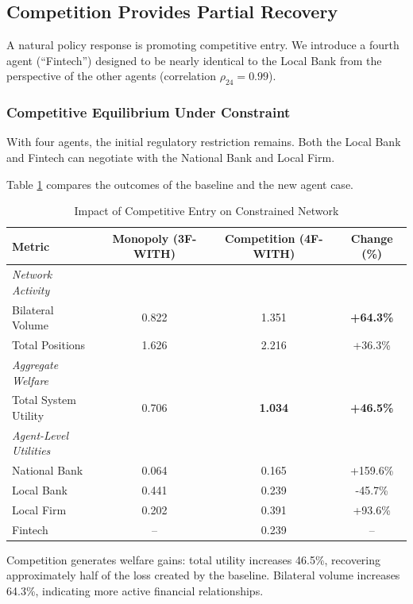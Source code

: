 \documentclass[12pt]{article}
\begin{document}
\subsection{Competition Provides Partial Recovery}
\label{sec:competition_results}

A natural policy response is promoting competitive entry. We introduce a fourth agent (``Fintech'') designed to be nearly identical to the Local Bank from the perspective of the other agents (correlation $\rho_{24} = 0.99$).

\subsubsection{Competitive Equilibrium Under Constraint}

With four agents, the initial regulatory restriction remains. Both the Local Bank and Fintech can negotiate with the National Bank and Local Firm.

Table \ref{tab:competition_results} compares the outcomes of the baseline and the new agent case.


\begin{table}[h]
\centering
\caption{Impact of Competitive Entry on Constrained Network}
\label{tab:competition_results}
\begin{tabular}{lccc}
\toprule
\textbf{Metric} & \textbf{Monopoly (3F-WITH)} & \textbf{Competition (4F-WITH)} & \textbf{Change (\%)} \\
\midrule
\textit{Network Activity} & & & \\
\quad Bilateral Volume & 0.822 & 1.351 & \textbf{+64.3\%} \\
\quad Total Positions & 1.626 & 2.216 & +36.3\% \\
\midrule
\textit{Aggregate Welfare} & & & \\
\quad Total System Utility & 0.706 & \textbf{1.034} & \textbf{+46.5\%} \\
\midrule
\textit{Agent-Level Utilities} & & & \\
\quad National Bank & 0.064 & 0.165 & +159.6\% \\
\quad Local Bank & 0.441 & 0.239 & -45.7\% \\
\quad Local Firm & 0.202 & 0.391 & +93.6\% \\
\quad Fintech & -- & 0.239 & -- \\
\bottomrule
\end{tabular}
\end{table}

Competition generates welfare gains: total utility increases 46.5\%, recovering approximately half of the loss created by the baseline. Bilateral volume increases 64.3\%, indicating more active financial relationships.
\end{document}
